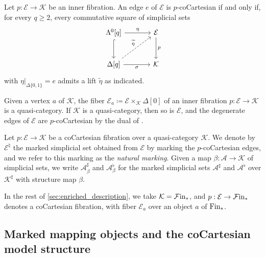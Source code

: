 \documentclass[10pt,reqno]{amsart}
\begin{document}
\begin{lemma}
\label{lem:cocartesian_edge_horn_criterion}
Let $p:\mathcal E\to\mathcal K$ be an inner fibration. An edge $e$
of $\mathcal E$ is $p$-coCartesian if and only if, for every
$q\geq2$, every commutative square of simplicial sets
\[
\begin{tikzcd}[ampersand replacement=\&, sep=large]
\Lambda^0[q]\arrow[r,"\eta"]\arrow[d,hook]
\&\mathcal E\arrow[d,"p"]\\
\Delta[q]\arrow[r,"\sigma"']\arrow[ur,dashed,"\widetilde\eta"]
\&\mathcal K
\end{tikzcd}
\]
with $\eta|_{\Delta\{0,1\}}=e$ admits a lift $\widetilde\eta$ as
indicated.
\end{lemma}

Given a vertex $a$ of $\mathcal K$, the fiber
$\mathcal E_a\coloneqq\mathcal E\times_{\mathcal K}\Delta[0]$ of an
inner fibration $p:\mathcal E\to\mathcal K$ is a quasi-category. If
$\mathcal K$ is a quasi-category, then so is $\mathcal E$, and the
degenerate edges of $\mathcal E$ are $p$-coCartesian by the dual of
\cite[Corollary~2.4.1.6]{lurie2009higher}.

\begin{notation}
\label{not:natural_marking}
Let $p:\mathcal E\to\mathcal K$ be a coCartesian fibration over a
quasi-category $\mathcal K$. We denote by $\mathcal E^\natural$ the
marked simplicial set obtained from $\mathcal E$ by marking the
$p$-coCartesian edges, and we refer to this marking as the
\emph{natural marking}. Given a map $\beta:\mathcal A\to\mathcal K$
of simplicial sets, we write $\mathcal A^\sharp_\beta$ and
$\mathcal A^\flat_\beta$ for the marked simplicial sets
$\mathcal A^\sharp$ and $\mathcal A^\flat$ over
$\mathcal K^\sharp$ with structure map $\beta$.
\end{notation}

In the rest of \cref{sec:enriched_description}, we take
$\mathcal K=\mathcal{F}\mathrm{in}_*$, and
$p:\mathcal E\to\mathcal{F}\mathrm{in}_*$ denotes a coCartesian fibration, with fiber
$\mathcal E_a$ over an object $a$ of $\mathrm{Fin}_*$.

\subsection{Marked mapping objects and the coCartesian model structure}
\label{subsec:marked_mapping_objects}
\end{document}
